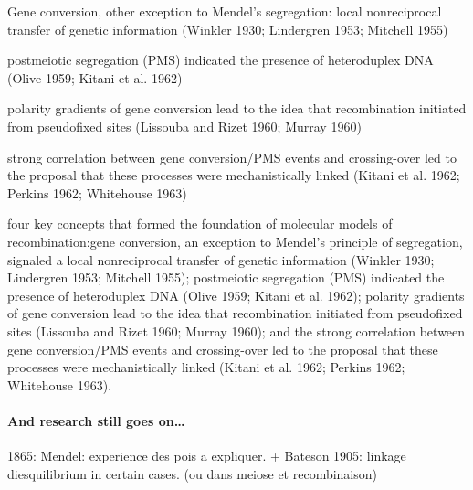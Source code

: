 Gene conversion, other exception to Mendel's segregation: local nonreciprocal transfer of genetic information (Winkler 1930; Lindergren 1953; Mitchell 1955)

postmeiotic segregation (PMS) indicated the presence of heteroduplex DNA (Olive 1959; Kitani et al. 1962)

polarity gradients of gene conversion lead to the idea that recombination initiated from pseudofixed sites (Lissouba and Rizet 1960; Murray 1960)

strong correlation between gene conversion/PMS events and crossing-over led to the proposal that these processes were mechanistically linked (Kitani et al. 1962; Perkins 1962; Whitehouse 1963)








four key concepts that formed the foundation of molecular models of recombination:gene conversion, an exception to Mendel’s principle of segregation, signaled a local nonreciprocal transfer of genetic information (Winkler 1930; Lindergren 1953; Mitchell 1955); postmeiotic segregation (PMS) indicated the presence of heteroduplex DNA (Olive 1959; Kitani et al. 1962); polarity gradients of gene conversion lead to the idea that recombination initiated from pseudofixed sites (Lissouba and Rizet 1960; Murray 1960); and the strong correlation between gene conversion/PMS events and crossing-over led to the proposal that these processes were mechanistically linked (Kitani et al. 1962; Perkins 1962; Whitehouse 1963).









\paragraph{And research still goes on…}







1865: Mendel: experience des pois a expliquer.
+ Bateson 1905: linkage diesquilibrium in certain cases. (ou dans meiose et recombinaison)


